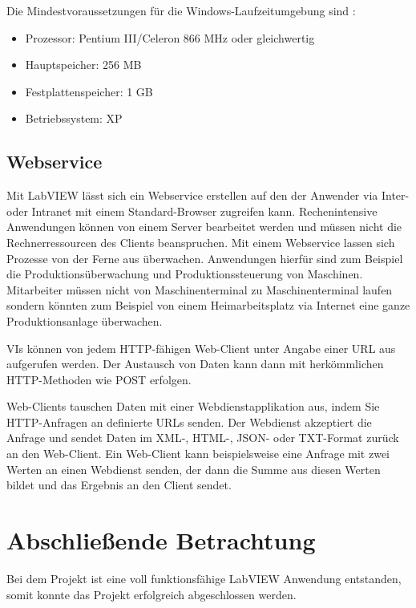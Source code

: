 Die Mindestvoraussetzungen für die Windows-Laufzeitumgebung sind \cite{ni-min}: 
\begin{itemize}
\item Prozessor: Pentium III/Celeron 866 MHz oder gleichwertig
\item Hauptspeicher: 256 MB
\item Festplattenspeicher: 1 GB
\item Betriebssystem: XP
\end{itemize}

\subsection{Webservice}


Mit LabVIEW lässt sich ein Webservice erstellen auf den der Anwender via Inter- oder Intranet mit einem Standard-Browser zugreifen kann. 
Rechenintensive Anwendungen können von einem Server  bearbeitet werden und müssen nicht die Rechnerressourcen des Clients beanspruchen. 
Mit einem Webservice lassen sich Prozesse von der Ferne aus überwachen. Anwendungen hierfür sind zum Beispiel die Produktionsüberwachung und Produktionssteuerung von Maschinen. Mitarbeiter müssen nicht von Maschinenterminal zu Maschinenterminal laufen sondern könnten zum Beispiel von einem Heimarbeitsplatz via Internet eine ganze Produktionsanlage überwachen.

VIs können von jedem HTTP-fähigen Web-Client unter Angabe einer URL aus aufgerufen werden. Der Austausch von Daten kann dann mit herkömmlichen HTTP-Methoden wie POST erfolgen. 

Web-Clients tauschen Daten mit einer Webdienstapplikation aus, indem Sie HTTP-Anfragen an definierte URLs senden. Der Webdienst akzeptiert die Anfrage und sendet Daten im XML-, HTML-, JSON- oder TXT-Format zurück an den Web-Client. Ein Web-Client kann beispielsweise eine Anfrage mit zwei Werten an einen Webdienst senden, der dann die Summe aus diesen Werten bildet und das Ergebnis an den Client sendet. \cite{LabViewHilfe}





\section{Abschließende Betrachtung}
Bei dem Projekt ist eine voll funktionsfähige LabVIEW Anwendung entstanden, somit konnte das Projekt erfolgreich abgeschlossen werden. 

